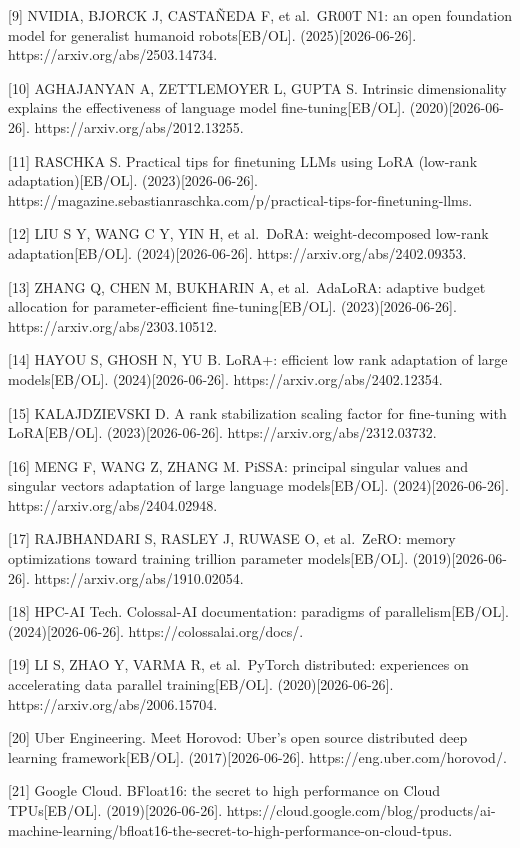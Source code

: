 \documentclass[
  chinese,
]{ctexart}
\begin{document}
{[}9{]} NVIDIA, BJORCK J, CASTAÑEDA F, et al.~GR00T N1: an open
foundation model for generalist humanoid robots{[}EB/OL{]}.
(2025){[}2026-06-26{]}. https://arxiv.org/abs/2503.14734.

{[}10{]} AGHAJANYAN A, ZETTLEMOYER L, GUPTA S. Intrinsic dimensionality
explains the effectiveness of language model fine-tuning{[}EB/OL{]}.
(2020){[}2026-06-26{]}. https://arxiv.org/abs/2012.13255.

{[}11{]} RASCHKA S. Practical tips for finetuning LLMs using LoRA
(low-rank adaptation){[}EB/OL{]}. (2023){[}2026-06-26{]}.
https://magazine.sebastianraschka.com/p/practical-tips-for-finetuning-llms.

{[}12{]} LIU S Y, WANG C Y, YIN H, et al.~DoRA: weight-decomposed
low-rank adaptation{[}EB/OL{]}. (2024){[}2026-06-26{]}.
https://arxiv.org/abs/2402.09353.

{[}13{]} ZHANG Q, CHEN M, BUKHARIN A, et al.~AdaLoRA: adaptive budget
allocation for parameter-efficient fine-tuning{[}EB/OL{]}.
(2023){[}2026-06-26{]}. https://arxiv.org/abs/2303.10512.

{[}14{]} HAYOU S, GHOSH N, YU B. LoRA+: efficient low rank adaptation of
large models{[}EB/OL{]}. (2024){[}2026-06-26{]}.
https://arxiv.org/abs/2402.12354.

{[}15{]} KALAJDZIEVSKI D. A rank stabilization scaling factor for
fine-tuning with LoRA{[}EB/OL{]}. (2023){[}2026-06-26{]}.
https://arxiv.org/abs/2312.03732.

{[}16{]} MENG F, WANG Z, ZHANG M. PiSSA: principal singular values and
singular vectors adaptation of large language models{[}EB/OL{]}.
(2024){[}2026-06-26{]}. https://arxiv.org/abs/2404.02948.

{[}17{]} RAJBHANDARI S, RASLEY J, RUWASE O, et al.~ZeRO: memory
optimizations toward training trillion parameter models{[}EB/OL{]}.
(2019){[}2026-06-26{]}. https://arxiv.org/abs/1910.02054.

{[}18{]} HPC-AI Tech. Colossal-AI documentation: paradigms of
parallelism{[}EB/OL{]}. (2024){[}2026-06-26{]}.
https://colossalai.org/docs/.

{[}19{]} LI S, ZHAO Y, VARMA R, et al.~PyTorch distributed: experiences
on accelerating data parallel training{[}EB/OL{]}.
(2020){[}2026-06-26{]}. https://arxiv.org/abs/2006.15704.

{[}20{]} Uber Engineering. Meet Horovod: Uber's open source distributed
deep learning framework{[}EB/OL{]}. (2017){[}2026-06-26{]}.
https://eng.uber.com/horovod/.

{[}21{]} Google Cloud. BFloat16: the secret to high performance on Cloud
TPUs{[}EB/OL{]}. (2019){[}2026-06-26{]}.
https://cloud.google.com/blog/products/ai-machine-learning/bfloat16-the-secret-to-high-performance-on-cloud-tpus.
\end{document}
